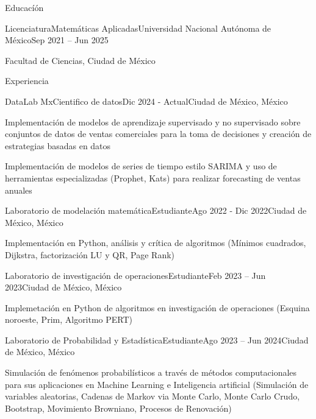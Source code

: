\documentclass[]{kyvernitis-resume}
\begin{document}
\resumeheader
{}
{}
{}




\begin{section}{Educacíón}
    \begin{subsectionnobullet}{Licenciatura}{Matemáticas Aplicadas}{Universidad Nacional Autónoma de México}{Sep 2021 -- Jun 2025}
    \item Facultad de Ciencias, Ciudad de México
    \end{subsectionnobullet}
\end{section}

\begin{section}{Experiencia}
	\begin{subsection}{DataLab Mx}{Cientifico de datos}{Dic 2024 - Actual}{Ciudad de México, México}
		\item Implementación de modelos de aprendizaje supervisado y no supervisado sobre conjuntos de datos de ventas comerciales para la toma de decisiones y creación de estrategias basadas en datos
		
		\item Implementación de modelos de series de tiempo estilo SARIMA y uso de herramientas especializadas (Prophet, Kats) para realizar forecasting de ventas anuales
		
	\end{subsection}
	
    \begin{subsection}{Laboratorio de modelación matemática}{Estudiante}{Ago 2022 - Dic 2022}{Ciudad de México, México}
        \item Implementación en Python, análisis y crítica de algoritmos (Mínimos cuadrados, Dijkstra, factorización LU y QR, Page Rank)
    \end{subsection}
    
    \begin{subsection}{Laboratorio de investigación de operaciones}{Estudiante}{Feb 2023 -- Jun 2023}{Ciudad de México, México}
        \item Implemetación en Python de algoritmos en investigación de operaciones (Esquina noroeste, Prim, Algoritmo PERT)
    \end{subsection}
	
	\begin{subsection}{Laboratorio de Probabilidad y Estadística}{Estudiante}{Ago 2023 -- Jun 2024}{Ciudad de México, México}
		\item Simulación de fenómenos probabilísticos a través de métodos computacionales para sus aplicaciones en Machine Learning e Inteligencia artificial (Simulación de variables aleatorias, Cadenas de Markov via Monte Carlo, Monte Carlo Crudo, Bootstrap, Movimiento Browniano, Procesos de Renovación)
		

\end{subsection}
\end{section}
\end{document}
